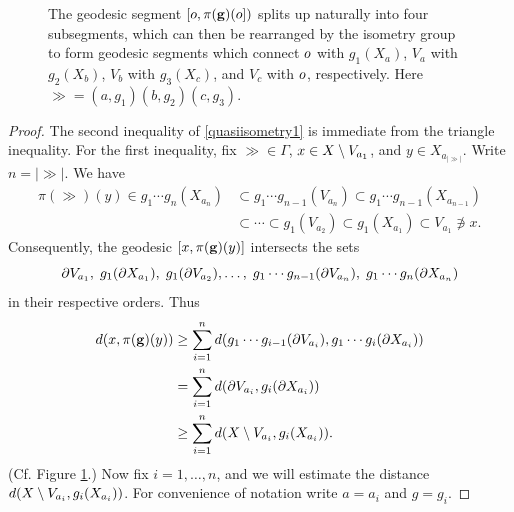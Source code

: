 \begin{figure}
\begin{center}
\caption[The strong separation lemma for Schottky products]{The geodesic segment $[o,\pi(\mathbf g)(o])$ splits up naturally into four subsegments, which can then be rearranged by the isometry group to form geodesic segments which connect $o$ with $g_1(X_a)$, $V_a$ with $g_2(X_b)$, $V_b$ with $g_3(X_c)$, and $V_c$ with $o$, respectively. Here $\gg = (a,g_1)(b,g_2)(c,g_3)$.}
\label{figureschottkylemma}
\end{center}
\end{figure}
\begin{proof}
The second inequality of \eqref{quasiisometry1} is immediate from the triangle inequality. For the first inequality, fix $\gg\in\Gamma$, $x\in X\setminus V_{a_1}$, and $y\in X_{a_{|\gg|}}$. Write $n = |\gg|$. We have
\begin{align*}
\pi(\gg)(y)
\in g_1\cdots g_n(X_{a_n})
&\subset g_1\cdots g_{n - 1}(V_{a_n}) 
\subset g_1\cdots g_{n - 1}(X_{a_{n - 1}})\\ 
&\subset \cdots \subset g_1(V_{a_2})
\subset g_1(X_{a_1}) \subset V_{a_1} \not\ni x.
\end{align*}
Consequently, the geodesic $[x,\pi(\mathbf g)(y)]$ intersects the sets
\[
\partial V_{a_1},\; g_1(\partial X_{a_1}),\; g_1(\partial V_{a_2}), \ldots,\; g_1\cdots g_{n - 1}(\partial V_{a_n}),\; g_1\cdots g_n(\partial X_{a_n})
\]
in their respective orders. Thus
\begin{equation}
\label{d0pig}
\begin{split}
d(x,\pi(\mathbf g)(y))
&\geq \sum_{i = 1}^n d(g_1\cdots g_{i - 1}(\partial V_{a_i}),g_1\cdots g_i(\partial X_{a_i}))\\
&= \sum_{i = 1}^n d(\partial V_{a_i},g_i(\partial X_{a_i}))\\
&\geq \sum_{i = 1}^n d(X\setminus V_{a_i}, g_i(X_{a_i})).
\end{split}
\end{equation}
(Cf. Figure \ref{figureschottkylemma}.) Now fix $i = 1,\ldots,n$, and we will estimate the distance $d(X\setminus V_{a_i}, g_i(X_{a_i}))$. For convenience of notation write $a = a_i$ and $g = g_i$.


\end{proof}
